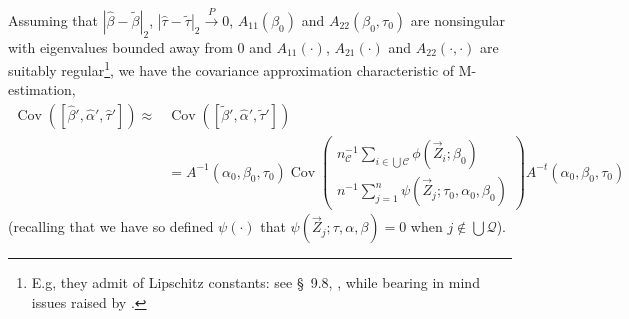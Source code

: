 \documentclass{article}
\begin{document}
Assuming that $|\hat\beta -\tilde\beta|_{2}$, 
$|\hat\tau -\tilde\tau|_{2} \stackrel{P}{\rightarrow} 0$,
$A_{11}(\beta_{0})$ and $A_{22}(\beta_{0}, \tau_{0})$ are nonsingular
with eigenvalues bounded away from 0 and $A_{11}(\cdot)$, $A_{21}(\cdot)$ and $A_{22}(\cdot, \cdot)$ are suitably
regular\footnote{E.g, they admit of Lipschitz constants: see \S~9.8,
  , while bearing in mind issues raised
  by .}, 
we have the covariance approximation characteristic of M-estimation,
\begin{align*} \operatorname{Cov}([\hat\beta',\hat\alpha', \hat\tau']) \approx&
  \operatorname{Cov}([\tilde\beta',\hat\alpha',\tilde\tau'])\\
  &=
  A^{-1}(\alpha_{0}, \beta_{0}, \tau_{0}) \operatorname{Cov}\left(
     \begin{array}{c}
       n_{\mathcal{C}}^{-1}\sum_{i\in \bigcup \mathcal{C}}\phi(\vec{Z}_{i}; \beta_{0} )\\
       n^{-1}\sum_{j=1}^{n}\psi(\vec{Z}_{j}; \tau_{0}, \alpha_{0}, \beta_{0} )
     \end{array}
\right)A^{-t}(\alpha_{0}, \beta_{0}, \tau_{0})
\end{align*}
(recalling that we have so defined $\psi(\cdot)$ that $\psi(\vec{Z}_{j}; \tau, \alpha, \beta) = 0$ when
$j\not\in \bigcup \mathcal{Q}$).
\end{document}
